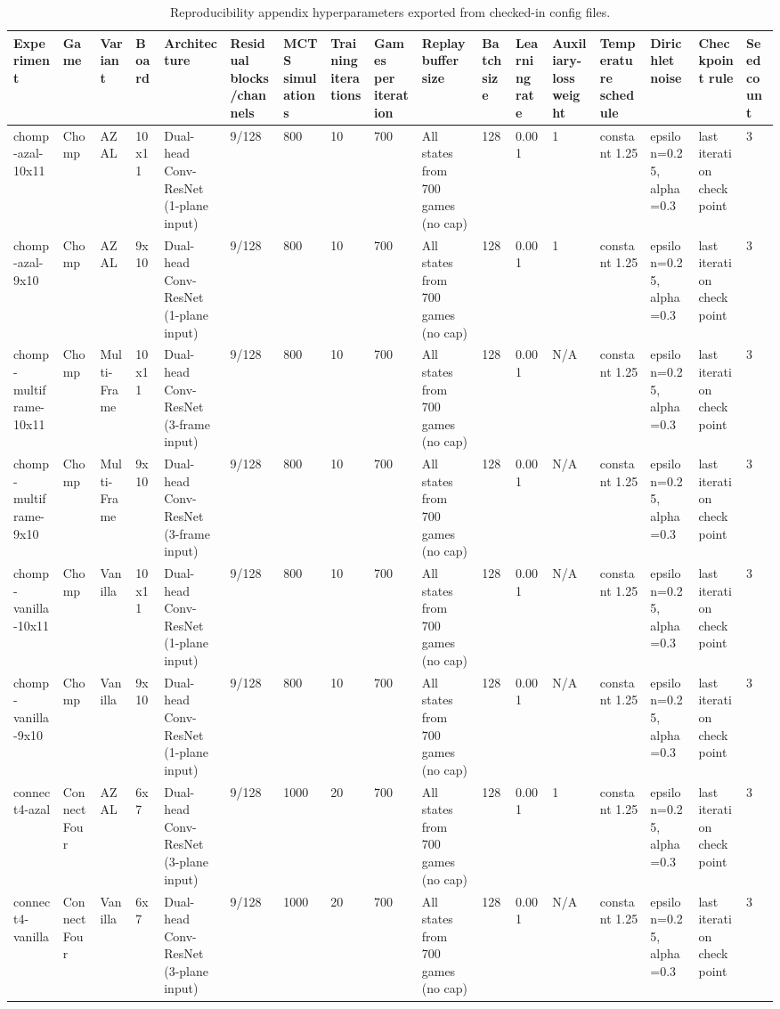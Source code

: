 \begin{table}[t]
\centering
\scriptsize
\setlength{\tabcolsep}{3pt}
\caption{Reproducibility appendix hyperparameters exported from checked-in config files.}
\label{tab:reproducibility_hyperparameters}
\begin{tabular}{lllllllllllllllll}
\toprule
Experiment & Game & Variant & Board & Architecture & Residual blocks/channels & MCTS simulations & Training iterations & Games per iteration & Replay buffer size & Batch size & Learning rate & Auxiliary-loss weight & Temperature schedule & Dirichlet noise & Checkpoint rule & Seed count \\
\midrule
chomp-azal-10x11 & Chomp & AZAL & 10x11 & Dual-head Conv-ResNet (1-plane input) & 9/128 & 800 & 10 & 700 & All states from 700 games (no cap) & 128 & 0.001 & 1 & constant 1.25 & epsilon=0.25, alpha=0.3 & last iteration checkpoint & 3 \\
chomp-azal-9x10 & Chomp & AZAL & 9x10 & Dual-head Conv-ResNet (1-plane input) & 9/128 & 800 & 10 & 700 & All states from 700 games (no cap) & 128 & 0.001 & 1 & constant 1.25 & epsilon=0.25, alpha=0.3 & last iteration checkpoint & 3 \\
chomp-multiframe-10x11 & Chomp & Multi-Frame & 10x11 & Dual-head Conv-ResNet (3-frame input) & 9/128 & 800 & 10 & 700 & All states from 700 games (no cap) & 128 & 0.001 & N/A & constant 1.25 & epsilon=0.25, alpha=0.3 & last iteration checkpoint & 3 \\
chomp-multiframe-9x10 & Chomp & Multi-Frame & 9x10 & Dual-head Conv-ResNet (3-frame input) & 9/128 & 800 & 10 & 700 & All states from 700 games (no cap) & 128 & 0.001 & N/A & constant 1.25 & epsilon=0.25, alpha=0.3 & last iteration checkpoint & 3 \\
chomp-vanilla-10x11 & Chomp & Vanilla & 10x11 & Dual-head Conv-ResNet (1-plane input) & 9/128 & 800 & 10 & 700 & All states from 700 games (no cap) & 128 & 0.001 & N/A & constant 1.25 & epsilon=0.25, alpha=0.3 & last iteration checkpoint & 3 \\
chomp-vanilla-9x10 & Chomp & Vanilla & 9x10 & Dual-head Conv-ResNet (1-plane input) & 9/128 & 800 & 10 & 700 & All states from 700 games (no cap) & 128 & 0.001 & N/A & constant 1.25 & epsilon=0.25, alpha=0.3 & last iteration checkpoint & 3 \\
connect4-azal & Connect Four & AZAL & 6x7 & Dual-head Conv-ResNet (3-plane input) & 9/128 & 1000 & 20 & 700 & All states from 700 games (no cap) & 128 & 0.001 & 1 & constant 1.25 & epsilon=0.25, alpha=0.3 & last iteration checkpoint & 3 \\
connect4-vanilla & Connect Four & Vanilla & 6x7 & Dual-head Conv-ResNet (3-plane input) & 9/128 & 1000 & 20 & 700 & All states from 700 games (no cap) & 128 & 0.001 & N/A & constant 1.25 & epsilon=0.25, alpha=0.3 & last iteration checkpoint & 3 \\
\bottomrule
\end{tabular}
\end{table}
